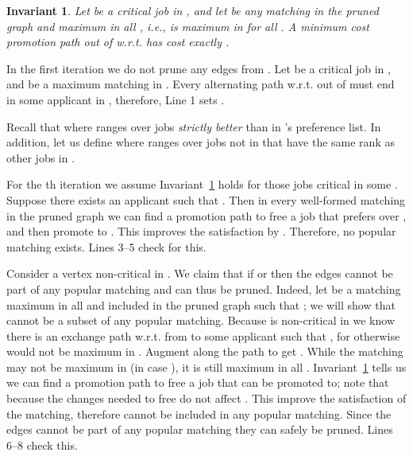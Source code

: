 \documentclass[11pt]{article}
\newcommand{\wrt}{{w.r.t.}\xspace}
\newtheorem{invariant}{Invariant}
\begin{document}
{\begin{invariant} \label{invariant:label-ties} Let  be a critical job in , and let  be any matching in the pruned graph and maximum in all , i.e.,  is maximum in  for all . A minimum cost promotion path out of  \wrt  has cost exactly .
\end{invariant}

In the first iteration we do not prune any edges from . Let  be a critical job in , and  be a maximum matching in . Every alternating path \wrt  out of  must end in some applicant in , therefore, Line 1 sets .

Recall that  where  ranges over jobs \emph{strictly better} than  in 's preference list. In addition, let us define  where  ranges over jobs not in  that have the same rank as other jobs in .

For the th iteration we assume Invariant~\ref{invariant:label-ties} holds for those jobs critical in some . Suppose there exists an applicant  such that . Then in every well-formed matching in the pruned graph we can find a promotion path to free a job  that  prefers over , and then promote  to . This improves the satisfaction by . Therefore, no popular matching exists. Lines 3--5 check for this.

Consider a vertex  non-critical in . We claim that if  or  then the edges  cannot be part of any popular matching and can thus be pruned. Indeed, let  be a matching maximum in all  and included in the pruned graph such that ; we will show that  cannot be a subset of any popular matching. Because  is non-critical in  we know there is an exchange path \wrt  from  to some applicant  such that , for otherwise  would not be maximum in . Augment along the path to get . While the matching  may not be maximum in  (in case ), it is still maximum in all . Invariant~\ref{invariant:label-ties} tells us we can find a promotion path to free a job  that  can be promoted to; note that because  the changes needed to free  do not affect . This improve the satisfaction of the matching, therefore  cannot be included in any popular matching. Since the edges  cannot be part of any popular matching they can safely be pruned. Lines 6--8 check this.

}
\end{document}
